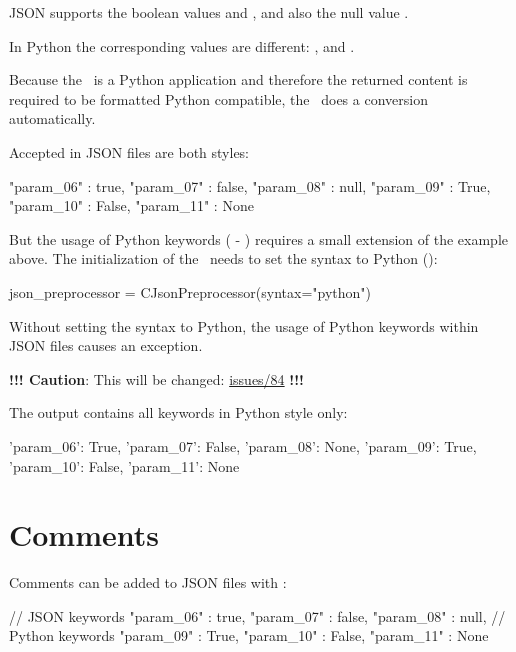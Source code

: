 JSON supports the boolean values  and , and also the null value .

In Python the corresponding values are different: ,  and .

Because the \pkg\ is a Python application and therefore the returned content is required to be formatted Python compatible,
the \pkg\ does a conversion automatically.

Accepted in JSON files are both styles:

\begin{pythoncode}
{
   "param_06" : true,
   "param_07" : false,
   "param_08" : null,
   "param_09" : True,
   "param_10" : False,
   "param_11" : None
}
\end{pythoncode}

But the usage of Python keywords ( - ) requires a small extension of the example above.
The initialization of the \pkg\ needs to set the syntax to Python ():

\begin{pythoncode}
json_preprocessor = CJsonPreprocessor(syntax="python")
\end{pythoncode}

Without setting the syntax to Python, the usage of Python keywords within JSON files causes an exception.

\textbf{!!! Caution}: This will be changed:
\href{https://github.com/test-fullautomation/python-jsonpreprocessor/issues/84}{issues/84} \textbf{!!!}

The output contains all keywords in Python style only:

\begin{pythonlog}
{'param_06': True,
 'param_07': False,
 'param_08': None,
 'param_09': True,
 'param_10': False,
 'param_11': None}
\end{pythonlog}


\newpage

\section{Comments}

Comments can be added to JSON files with \pcode{//}:

\begin{pythoncode}
{
   // JSON keywords
   "param_06" : true,
   "param_07" : false,
   "param_08" : null,
   // Python keywords
   "param_09" : True,
   "param_10" : False,
   "param_11" : None
}
\end{pythoncode}

